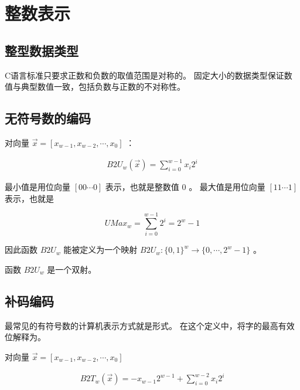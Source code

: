 
\section{整数表示}
{
    \subsection{整型数据类型}
    {
        C语言标准只要求正数和负数的取值范围是对称的。
        固定大小的数据类型保证数值与典型数值一致，包括负数与正数的不对称性。
    }

    \subsection{无符号数的编码}
    {
        \begin{defines}[无符号数编码的定义]
            对向量 $\vec x = [x_{w - 1}, x_{w -2}, \cdots, x_0]$ ：

            \begin{align}
                B2U_w(\vec x) = \sum_{i = 0}^{w - 1} x_i2^i
            \end{align}
        \end{defines}

        最小值是用位向量 $[00\cdots0]$ 表示，也就是整数值 $0$ 。
        最大值是用位向量 $[11\cdots1]$ 表示，也就是

        $$UMax_w = \sum_{i = 0}^{w - 1} 2^i = 2^w - 1$$

        因此函数 $B2U_w$ 能被定义为一个映射 $B2U_w: \{0, 1\}^w \rightarrow \{0, \cdots, 2^w - 1\}$ 。

        \begin{defines}[无符号数编码的唯一性]
            函数 $B2U_w$ 是一个双射。
        \end{defines}
    }

    \subsection{补码编码}
    {
        最常见的有符号数的计算机表示方式就是形式。
        在这个定义中，将字的最高有效位解释为。

        \begin{defines}[补码编码的定义]
            对向量 $\vec x = [x_{w - 1}, x_{w - 2}, \cdots, x_0]$

            \begin{align}
                B2T_w(\vec x) = -x_{w - 1}2^{w - 1} + \sum_{i = 0}^{w - 2}x_i2^i
            \end{align}
        \end{defines}

}}
